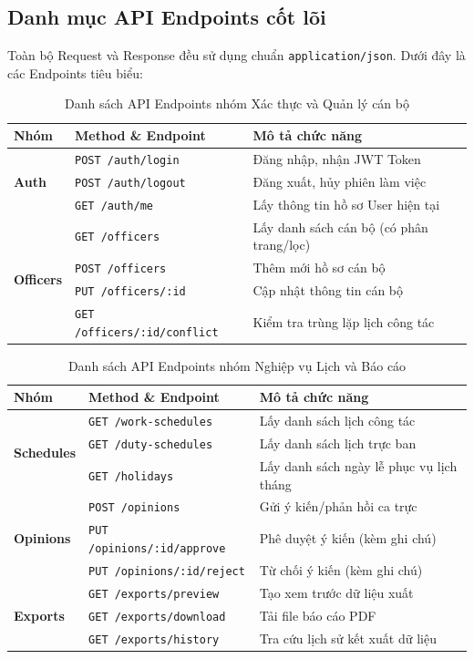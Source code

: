 \documentclass[18pt,a4paper]{report}
\begin{document}
\subsection{Danh mục API Endpoints cốt lõi}
Toàn bộ Request và Response đều sử dụng chuẩn \texttt{application/json}. Dưới đây là các Endpoints tiêu biểu:

\begin{table}[H]
\centering
\caption{Danh sách API Endpoints nhóm Xác thực và Quản lý cán bộ}
\begin{tabularx}{\textwidth}{|l|l|X|}
\hline
\textbf{Nhóm} & \textbf{Method \& Endpoint} & \textbf{Mô tả chức năng} \\ \hline
\multirow{3}{*}{\textbf{Auth}} & \texttt{POST /auth/login} & Đăng nhập, nhận JWT Token \\ \cline{2-3}
& \texttt{POST /auth/logout} & Đăng xuất, hủy phiên làm việc \\ \cline{2-3}
& \texttt{GET /auth/me} & Lấy thông tin hồ sơ User hiện tại \\ \hline
\multirow{4}{*}{\textbf{Officers}} & \texttt{GET /officers} & Lấy danh sách cán bộ (có phân trang/lọc) \\ \cline{2-3}
& \texttt{POST /officers} & Thêm mới hồ sơ cán bộ \\ \cline{2-3}
& \texttt{PUT /officers/:id} & Cập nhật thông tin cán bộ \\ \cline{2-3}
& \texttt{GET /officers/:id/conflict} & Kiểm tra trùng lặp lịch công tác \\ \hline
\end{tabularx}
\end{table}

\begin{table}[H]
\centering
\caption{Danh sách API Endpoints nhóm Nghiệp vụ Lịch và Báo cáo}
\begin{tabularx}{\textwidth}{|l|l|X|}
\hline
\textbf{Nhóm} & \textbf{Method \& Endpoint} & \textbf{Mô tả chức năng} \\ \hline
\multirow{3}{*}{\textbf{Schedules}} & \texttt{GET /work-schedules} & Lấy danh sách lịch công tác \\ \cline{2-3}
& \texttt{GET /duty-schedules} & Lấy danh sách lịch trực ban \\ \cline{2-3}
& \texttt{GET /holidays} & Lấy danh sách ngày lễ phục vụ lịch tháng \\ \hline
\multirow{3}{*}{\textbf{Opinions}} & \texttt{POST /opinions} & Gửi ý kiến/phản hồi ca trực \\ \cline{2-3}
& \texttt{PUT /opinions/:id/approve} & Phê duyệt ý kiến (kèm ghi chú) \\ \cline{2-3}
& \texttt{PUT /opinions/:id/reject} & Từ chối ý kiến (kèm ghi chú) \\ \hline
\multirow{3}{*}{\textbf{Exports}} & \texttt{GET /exports/preview} & Tạo xem trước dữ liệu xuất \\ \cline{2-3}
& \texttt{GET /exports/download} & Tải file báo cáo PDF \\ \cline{2-3}
& \texttt{GET /exports/history} & Tra cứu lịch sử kết xuất dữ liệu \\ \hline
\end{tabularx}
\end{table}
\end{document}
